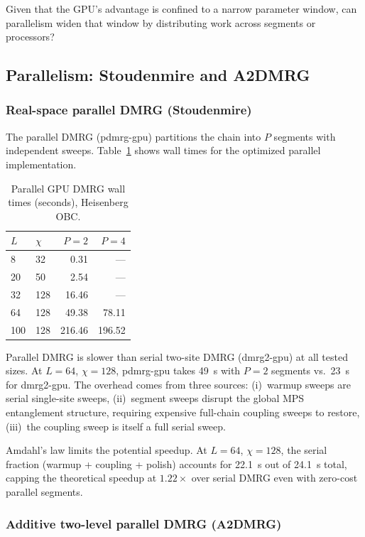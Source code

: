 \documentclass[preprint,12pt]{elsarticle}
\begin{document}
Given that the GPU's advantage is confined to a narrow parameter window, can parallelism widen that window by distributing work across segments or processors?

\subsection{Parallelism: Stoudenmire and A2DMRG}
\label{sec:parallel}

\subsubsection{Real-space parallel DMRG (Stoudenmire)}

The parallel DMRG (pdmrg-gpu) partitions the chain into $P$ segments with independent sweeps.
Table~\ref{tab:pdmrg} shows wall times for the optimized parallel implementation.

\begin{table}[h]
\centering
\caption{Parallel GPU DMRG wall times (seconds), Heisenberg OBC.}
\label{tab:pdmrg}
\begin{tabular}{llrr}
\toprule
$L$ & $\chi$ & $P = 2$ & $P = 4$ \\
\midrule
8   & 32  & 0.31 & --- \\
20  & 50  & 2.54 & --- \\
32  & 128 & 16.46 & --- \\
64  & 128 & 49.38 & 78.11 \\
100 & 128 & 216.46 & 196.52 \\
\bottomrule
\end{tabular}
\end{table}

Parallel DMRG is slower than serial two-site DMRG (dmrg2-gpu) at all tested sizes.
At $L = 64$, $\chi = 128$, pdmrg-gpu takes 49~s with $P = 2$ segments vs.\ 23~s for dmrg2-gpu.
The overhead comes from three sources:
(i)~warmup sweeps are serial single-site sweeps,
(ii)~segment sweeps disrupt the global MPS entanglement structure, requiring expensive full-chain coupling sweeps to restore,
(iii)~the coupling sweep is itself a full serial sweep.

Amdahl's law limits the potential speedup.
At $L = 64$, $\chi = 128$, the serial fraction (warmup + coupling + polish) accounts for 22.1~s out of 24.1~s total, capping the theoretical speedup at $1.22\times$ over serial DMRG even with zero-cost parallel segments.

\subsubsection{Additive two-level parallel DMRG (A2DMRG)}
\end{document}
